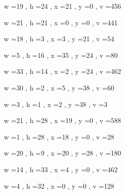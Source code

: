 \documentclass[11pt]{article}
\begin{document}
w =19 , h =24 , x =21 , y =0 , v =456
\par
w =21 , h =21 , x =0 , y =0 , v =441
\par
w =18 , h =3 , x =3 , y =21 , v =54
\par
w =5 , h =16 , x =35 , y =24 , v =80
\par
w =33 , h =14 , x =2 , y =24 , v =462
\par
w =30 , h =2 , x =5 , y =38 , v =60
\par
w =3 , h =1 , x =2 , y =38 , v =3
\par
\newpage




w =21 , h =28 , x =19 , y =0 , v =588
\par
w =1 , h =28 , x =18 , y =0 , v =28
\par
w =20 , h =9 , x =20 , y =28 , v =180
\par
w =14 , h =33 , x =4 , y =0 , v =462
\par
w =4 , h =32 , x =0 , y =0 , v =128
\par
\newpage
\end{document}
